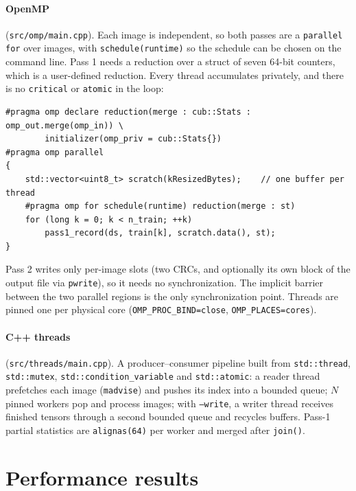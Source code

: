 \documentclass{zc-ust-hw}
\begin{document}
\paragraph{OpenMP} (\texttt{src/omp/main.cpp}). Each image is independent, so both passes are a
\texttt{parallel for} over images, with \texttt{schedule(runtime)} so the schedule can be chosen
on the command line. Pass 1 needs a reduction over a struct of seven 64-bit counters, which is a
user-defined reduction. Every thread accumulates privately, and there is no \texttt{critical} or
\texttt{atomic} in the loop:
\begin{lstlisting}
#pragma omp declare reduction(merge : cub::Stats : omp_out.merge(omp_in)) \
        initializer(omp_priv = cub::Stats{})
#pragma omp parallel
{
    std::vector<uint8_t> scratch(kResizedBytes);    // one buffer per thread
    #pragma omp for schedule(runtime) reduction(merge : st)
    for (long k = 0; k < n_train; ++k)
        pass1_record(ds, train[k], scratch.data(), st);
}
\end{lstlisting}
Pass 2 writes only per-image slots (two CRCs, and optionally its own block of the output file
via \texttt{pwrite}), so it needs no synchronization. The implicit barrier between the two
parallel regions is the only synchronization point. Threads are pinned one per physical core
(\texttt{OMP\_PROC\_BIND=close}, \texttt{OMP\_PLACES=cores}).

{\sloppy
\paragraph{C++ threads} (\texttt{src/threads/main.cpp}). A producer--consumer pipeline built
from \texttt{std::thread}, \texttt{std::mutex}, \texttt{std::}\allowbreak\texttt{condition\_variable} and
\texttt{std::atomic}: a reader thread prefetches each image (\texttt{madvise}) and pushes its
index into a bounded queue; $N$ pinned workers pop and process images; with \texttt{--write}, a
writer thread receives finished tensors through a second bounded queue and recycles buffers.
Pass-1 partial statistics are \texttt{alignas(64)} per worker and merged after
\texttt{join()}.\par}

\section{Performance results}
\end{document}
